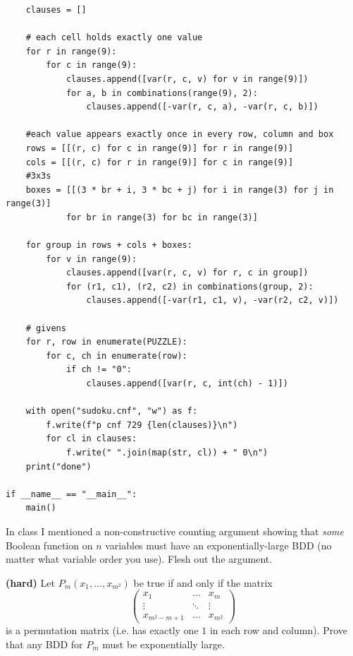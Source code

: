 \documentclass[11pt]{article}
\begin{document}
\begin{qunlist}
\begin{qparts}
\begin{answer}
\begin{verbatim}
    clauses = []

    # each cell holds exactly one value
    for r in range(9):
        for c in range(9):
            clauses.append([var(r, c, v) for v in range(9)])
            for a, b in combinations(range(9), 2):
                clauses.append([-var(r, c, a), -var(r, c, b)])

    #each value appears exactly once in every row, column and box
    rows = [[(r, c) for c in range(9)] for r in range(9)]
    cols = [[(r, c) for r in range(9)] for c in range(9)]
    #3x3s
    boxes = [[(3 * br + i, 3 * bc + j) for i in range(3) for j in range(3)]
            for br in range(3) for bc in range(3)]

    for group in rows + cols + boxes:
        for v in range(9):
            clauses.append([var(r, c, v) for r, c in group])
            for (r1, c1), (r2, c2) in combinations(group, 2):
                clauses.append([-var(r1, c1, v), -var(r2, c2, v)])

    # givens
    for r, row in enumerate(PUZZLE):
        for c, ch in enumerate(row):
            if ch != "0":
                clauses.append([var(r, c, int(ch) - 1)])

    with open("sudoku.cnf", "w") as f:
        f.write(f"p cnf 729 {len(clauses)}\n")
        for cl in clauses:
            f.write(" ".join(map(str, cl)) + " 0\n")
    print("done")

if __name__ == "__main__":
    main()
      \end{verbatim}
    \end{answer}
  \end{qparts}


  \begin{qparts}
  \item
    In class I mentioned a non-constructive counting argument showing that \emph{some} Boolean function on $n$ variables must have an exponentially-large BDD (no matter what variable order you use). Flesh out the argument.
  \item
    \textbf{(hard)} Let $P_m(x_1, \dots, x_{m^2})$ be true if and only if the matrix
    \[
      \left(
        \begin{array}{ccc}x_1 & \dots & x_m \\\vdots & \ddots & \vdots \\x_{m^2-m+1} & \dots & x_{m^2}
      \end{array}\right)
    \]
    is a permutation matrix (i.e. has exactly one $1$ in each row and column).
    Prove that any BDD for $P_m$ must be exponentially large.
  \end{qparts}

\end{qunlist}
\end{document}
